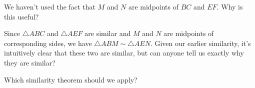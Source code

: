





We haven't used the fact that $M$ and $N$ are midpoints of $BC$ and $EF.$ Why is this useful?


Since $\triangle ABC $ and $\triangle AEF$ are similar and $M$ and $N$ are midpoints of corresponding sides, we have $\triangle ABM \sim \triangle AEN. $ Given our earlier similarity, it's intuitively clear that these two are similar, but can anyone tell us exactly why they are similar?

Which similarity theorem should we apply?












